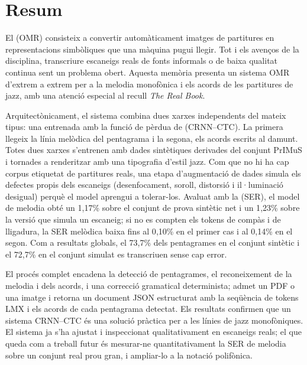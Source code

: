 \chapter*{Resum}

El  (OMR) consisteix a convertir automàticament
imatges de partitures en representacions simbòliques que una màquina pugui llegir. Tot i
els avenços de la disciplina, transcriure escaneigs reals de fonts informals o de baixa
qualitat continua sent un problema obert. Aquesta memòria presenta un sistema OMR
d'extrem a extrem per a la melodia monofònica i els acords de les partitures de jazz, amb
una atenció especial al recull \textit{The Real Book}.

Arquitectònicament, el sistema combina dues xarxes independents del mateix tipus: una
 entrenada amb la funció de pèrdua de
 (CRNN--CTC). La primera llegeix la línia melòdica del pentagrama i
la segona, els acords escrits al damunt. Totes dues xarxes s'entrenen amb dades sintètiques
derivades del conjunt PrIMuS i tornades a renderitzar amb una tipografia d'estil jazz. Com
que no hi ha cap corpus etiquetat de partitures reals, una etapa d'augmentació de dades
simula els defectes propis dels escaneigs (desenfocament, soroll, distorsió i il·luminació
desigual) perquè el model aprengui a tolerar-los. Avaluat amb la  (SER), el model de melodia obté un 1{,}17\% sobre el conjunt de prova sintètic net
i un 1{,}23\% sobre la versió que simula un escaneig; si no es compten els tokens de compàs
i de lligadura, la SER melòdica baixa fins al 0{,}10\% en el primer cas i al 0{,}14\% en el segon. Com a resultats globals, el 73{,}7\% dels pentagrames en el conjunt sintètic i el 72{,}7\% en el conjunt simulat es transcriuen sense cap error.

El procés complet encadena la detecció de pentagrames, el reconeixement de la melodia i
dels acords, i una correcció gramatical determinista; admet un PDF o una imatge i retorna
un document JSON estructurat amb la seqüència de tokens LMX i els acords de cada pentagrama
detectat. Els resultats confirmen que un sistema CRNN--CTC és una solució pràctica per a les
línies de jazz monofòniques. El sistema ja s'ha ajustat i inspeccionat qualitativament en
escaneigs reals; el que queda com a treball futur és mesurar-ne quantitativament la SER de
melodia sobre un conjunt real prou gran, i ampliar-lo a la notació polifònica.

